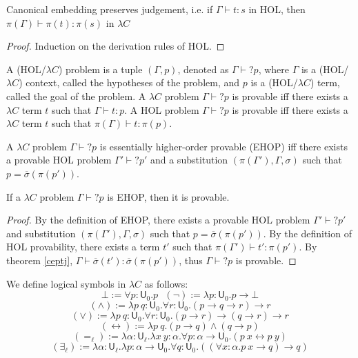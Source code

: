 \begin{theorem}\label{ceptj} Canonical embedding preserves judgement, i.e. if $\Gamma \vdash t : s$ in HOL, then
  $\pi(\Gamma) \vdash \pi(t) : \pi(s)$ in $\lambda C$ \end{theorem}
\begin{proof} Induction on the derivation rules of HOL. \end{proof}

\begin{definition} A (HOL/$\lambda C$) problem is a tuple $(\Gamma, p)$, denoted
  as $\Gamma \vdash? p$, where $\Gamma$ is a (HOL/$\lambda C$)
  context, called the hypotheses of the problem, and $p$ is a
  (HOL/$\lambda C$) term, called the goal of the problem. A $\lambda C$ problem
  $\Gamma \vdash? p$ is provable iff there exists a $\lambda C$ term $t$ such that
  $\Gamma \vdash t : p$. A HOL problem $\Gamma \vdash? p$ is provable iff there exists
  a $\lambda C$ term $t$ such that $\pi(\Gamma) \vdash t : \pi(p)$.
\end{definition}

\begin{definition} A $\lambda C$ problem $\Gamma \vdash? p$ is essentially higher-order provable (EHOP)
  iff there exists a provable HOL problem $\Gamma' \vdash? p'$ and a substitution
  $(\pi(\Gamma'), \Gamma, \sigma)$ such that $p = \overline{\sigma}(\pi(p'))$.
\end{definition}

\begin{theorem}
  If a $\lambda C$ problem $\Gamma \vdash? p$ is EHOP, then it is provable.
\end{theorem}
\begin{proof} By the definition of EHOP, there exists a provable HOL problem
  $\Gamma' \vdash? p'$ and substitution $(\pi(\Gamma'), \Gamma, \sigma)$ such that
  $p = \overline{\sigma}(\pi(p'))$. By the definition of HOL provability, there exists
  a term $t'$ such that $\pi(\Gamma') \vdash t' : \pi(p')$. By theorem \ref{ceptj},
  $\Gamma \vdash \overline{\sigma}(t') : \overline{\sigma}(\pi(p'))$, thus $\Gamma \vdash? p$
  is provable.
\end{proof}

\noindent We define logical symbols in $\lambda C$ as follows:
$$\bot := \forall p : \mathsf{U}_0. p \ \ \ (\neg) := \lambda p : \mathsf{U}_0. p \to \bot$$
$$(\land) := \lambda p \ q : \mathsf{U}_0. \forall r : \mathsf{U}_0. (p \to q \to r) \to r$$
$$(\lor) := \lambda p \ q : \mathsf{U}_0. \forall r : \mathsf{U}_0. (p \to r) \to (q \to r) \to r$$
$$(\leftrightarrow) := \lambda p \ q. (p \to q) \land (q \to p)$$
$$(=_\ell) := \lambda \alpha : \mathsf{U}_\ell. \lambda x \ y : \alpha. \forall p : \alpha \to \mathsf{U}_0. (p \ x \leftrightarrow p \ y)$$
$$(\exists_\ell) := \lambda \alpha : \mathsf{U}_\ell. \lambda p : \alpha \to \mathsf{U}_0. \forall q : \mathsf{U}_0. ((\forall x : \alpha. p \ x \to q) \to q)$$

